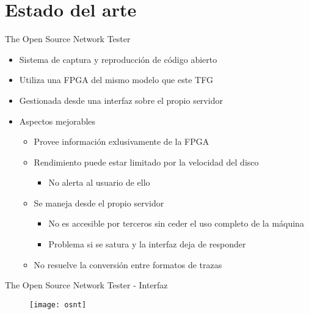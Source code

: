 \section{Estado del arte}

\begin{frame}{The Open Source Network Tester}
  \begin{itemize}
    \item Sistema de captura y reproducción de código abierto
    \item Utiliza una FPGA del mismo modelo que este TFG
    \item Gestionada desde una interfaz sobre el propio servidor
    \item Aspectos mejorables
    \begin{itemize}
      \item Provee información exlusivamente de la FPGA
      \item Rendimiento puede estar limitado por la velocidad del disco
      \begin{itemize}
        \item No alerta al usuario de ello
      \end{itemize}
      \item Se maneja desde el propio servidor
      \begin{itemize}
        \item No es accesible por terceros sin ceder el uso completo de la máquina
        \item Problema si se satura y la interfaz deja de responder
      \end{itemize}
      \item No resuelve la conversión entre formatos de trazas
    \end{itemize}
  \end{itemize}
\end{frame}

\begin{frame}{The Open Source Network Tester - Interfaz}
  \begin{figure}
    \texttt{[image: osnt]}
  \end{figure}
\end{frame}
